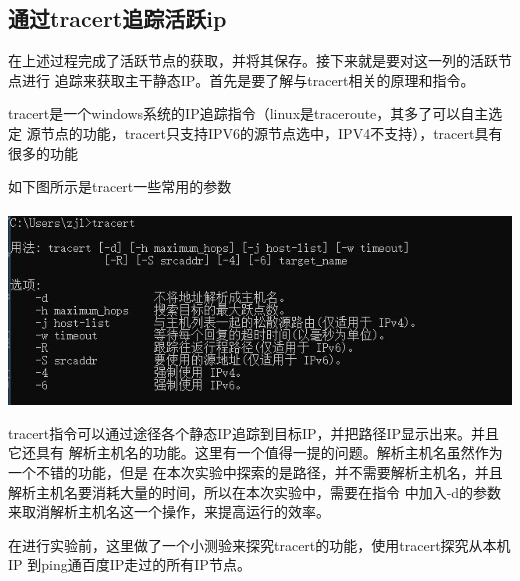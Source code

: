 \documentclass{article} %
\begin{document}
        \subsection{\Large 通过tracert追踪活跃ip}
        \par 在上述过程完成了活跃节点的获取，并将其保存。接下来就是要对这一列的活跃节点进行
        追踪来获取主干静态IP。首先是要了解与tracert相关的原理和指令。
        \par tracert是一个windows系统的IP追踪指令（linux是traceroute，其多了可以自主选定
        源节点的功能，tracert只支持IPV6的源节点选中，IPV4不支持），tracert具有很多的功能
        \par 如下图所示是tracert一些常用的参数\\
        \\
        \includegraphics[scale=0.8]{pic/tracert代码1.JPG}
        \par tracert指令可以通过途径各个静态IP追踪到目标IP，并把路径IP显示出来。并且它还具有
        解析主机名的功能。这里有一个值得一提的问题。解析主机名虽然作为一个不错的功能，但是
        在本次实验中探索的是路径，并不需要解析主机名，并且解析主机名要消耗大量的时间，所以在本次实验中，需要在指令
        中加入-d的参数来取消解析主机名这一个操作，来提高运行的效率。
        \par 在进行实验前，这里做了一个小测验来探究tracert的功能，使用tracert探究从本机IP
        到ping通百度IP走过的所有IP节点。\\
\end{document}
